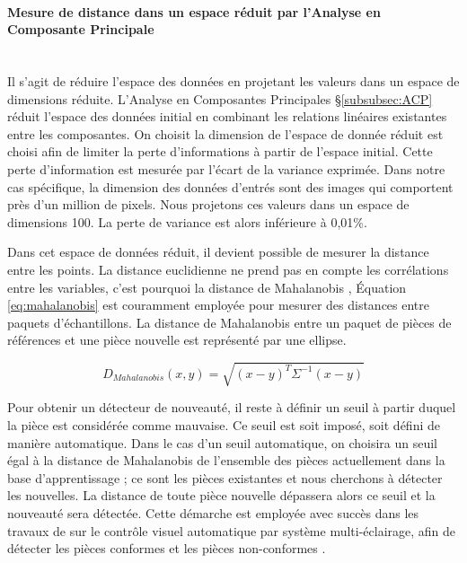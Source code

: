 \paragraph{Mesure de distance dans un espace réduit par l'Analyse en Composante Principale}\mbox{} \\
Il s'agit de réduire l'espace des données en projetant les valeurs dans un espace de dimensions réduite.
L'Analyse en Composantes Principales §\ref{subsubsec:ACP} réduit l'espace des données initial en combinant les relations linéaires existantes entre les composantes.
On choisit la dimension de l'espace de donnée réduit est choisi afin de limiter la perte d'informations à partir de l'espace initial.
Cette perte d'information est mesurée par l'écart de la variance exprimée.
Dans notre cas spécifique, la dimension des données d'entrés sont des images qui comportent près d'un million de pixels.
Nous projetons ces valeurs dans un espace de dimensions 100.
La perte de variance est alors inférieure à 0,01\%.

Dans cet espace de données réduit, il devient possible de mesurer la distance entre les points.
La distance euclidienne ne prend pas en compte les corrélations entre les variables, c'est pourquoi la distance de Mahalanobis \cite{mahalanobis_generalised_1936}, Équation \ref{eq:mahalanobis}  est couramment employée pour mesurer des distances entre paquets d'échantillons.
La distance de Mahalanobis entre un paquet de pièces de références et une pièce nouvelle est représenté par une ellipse.

\begin{equation} \label{eq:mahalanobis}
D_{Mahalanobis}(x, y)=\sqrt{(x - y)^{T} \Sigma^{-1}(x-y)}
\end{equation}

Pour obtenir un détecteur de nouveauté, il reste à définir un seuil à partir duquel la pièce est considérée comme mauvaise.
Ce seuil est soit imposé, soit défini de manière automatique.
Dans le cas d'un seuil automatique, on choisira un seuil égal à la distance de Mahalanobis de l'ensemble des pièces actuellement dans la base d'apprentissage ; ce sont les pièces existantes et nous cherchons à détecter les nouvelles.
La distance de toute pièce nouvelle dépassera alors ce seuil et la nouveauté sera détectée.
Cette démarche est employée avec succès dans les travaux de \citeauthor{lacombe_exploitation_2018a} sur le contrôle visuel automatique par système multi-éclairage, afin de détecter les pièces conformes et les pièces non-conformes \cite{lacombe_exploitation_2018a}.

